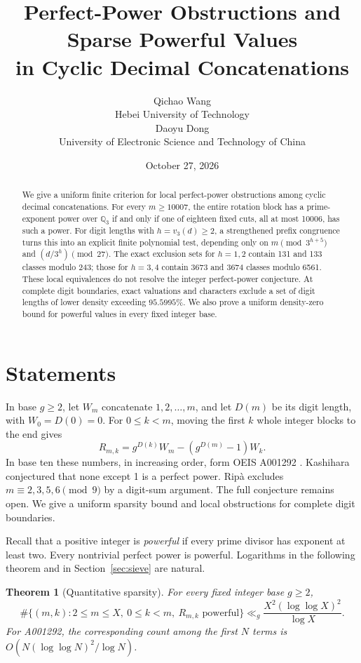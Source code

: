 \documentclass[10pt]{article}
\title{Perfect-Power Obstructions and Sparse Powerful Values\\in Cyclic Decimal Concatenations}
\author{Qichao Wang\\{\small Hebei University of Technology}\\[0.3em]
Daoyu Dong\\{\small University of Electronic Science and Technology of China}}
\date{October 27, 2026}
\newtheorem{theorem}{Theorem}
\newcommand{\Q}{\mathbb Q}
\begin{document}
\maketitle
\begin{abstract}
We give a uniform finite criterion for local perfect-power obstructions
among cyclic decimal concatenations. For every $m\ge10007$, the entire
rotation block has a prime-exponent power over $\Q_3$ if and only if one
of eighteen fixed cuts, all at most 10006, has such a power. For digit
lengths with $h=v_3(d)\ge2$, a strengthened prefix congruence turns this
into an explicit finite polynomial test, depending only on
$m\pmod{3^{h+5}}$ and $(d/3^h)\pmod{27}$. The exact exclusion sets for
$h=1,2$ contain 131 and 133 classes modulo 243; those for $h=3,4$
contain 3673 and 3674 classes modulo 6561. These local equivalences do
not resolve the integer perfect-power conjecture. At complete digit
boundaries, exact valuations and characters exclude a set of digit
lengths of lower density exceeding $95.5995\%$. We also prove a uniform
density-zero bound for powerful values in every fixed integer base.
\end{abstract}

\section{Statements}
In base $g\ge2$, let $W_m$ concatenate $1,2,\ldots,m$, and let $D(m)$
be its digit length, with $W_0=D(0)=0$. For $0\le k<m$, moving the first
$k$ whole integer blocks to the end gives
\begin{equation}\label{eq:rotation}
 R_{m,k}=g^{D(k)}W_m-(g^{D(m)}-1)W_k.
\end{equation}
In base ten these numbers, in increasing order, form OEIS A001292
\cite{oeis}. Kashihara conjectured that none except 1 is a perfect power.
Rip\`a \cite{ripa} excludes $m\equiv2,3,5,6\pmod9$ by a digit-sum argument.
The full conjecture remains open. We give a uniform sparsity bound and
local obstructions for complete digit boundaries.

Recall that a positive integer is \emph{powerful} if every prime divisor
has exponent at least two. Every nontrivial perfect power is powerful.
Logarithms in the following theorem and in Section~\ref{sec:sieve} are natural.

\begin{theorem}[Quantitative sparsity]\label{thm:sparsity}
For every fixed integer base $g\ge2$,
\begin{equation}\label{eq:sparse}
 \#\{(m,k):2\le m\le X,\ 0\le k<m,\ R_{m,k}\text{ powerful}\}
 \ll_g \frac{X^2(\log\log X)^2}{\log X}.
\end{equation}
For A001292, the corresponding count among the first $N$ terms is
$O(N(\log\log N)^2/\log N)$.
\end{theorem}
\end{document}
